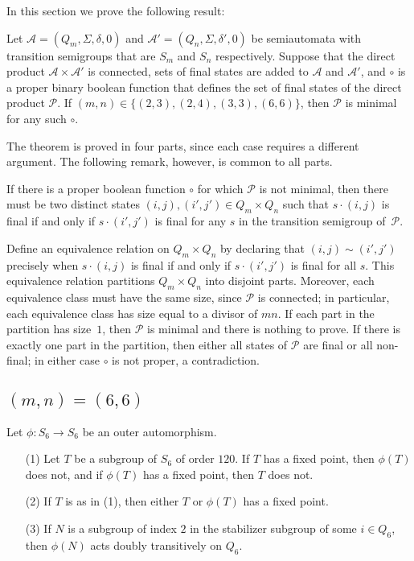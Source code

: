 \documentclass{llncs}
\newcommand{\Sig}{\Sigma}
\newcommand{\cA}{{\mathcal A}}
\newcommand{\cP}{{\mathcal P}}
\begin{document}
In this section we prove the following result:
\begin{theorem}
\label{thm: small}
Let $\cA=(Q_m,\Sig, \delta,0)$ and $\cA'=(Q_n,\Sig, \delta',0)$ be 
semiautomata with transition semigroups that are  $S_m$ and $S_n$ respectively. Suppose that the direct product $\cA\times \cA'$ is connected, sets of final states are added to $\cA$ and $\cA'$, and  $\circ$ is a proper binary boolean function that defines the set of final states of the direct product $\cP$. If $(m,n)\in \{(2,3),(2,4),(3,3),(6,6)\}$, then $\cP$ is minimal for any such $\circ$.
\end{theorem}
The theorem is proved in four parts, since each case requires  a different argument.
The following remark, however, is common to all parts.

\begin{remark}
\label{rem:equiv}
If  there is a proper boolean function $\circ$ for which $\cP$ is not minimal, then there must be two distinct states $(i,j), (i',j')\in Q_m\times Q_n$  such that $s\cdot (i,j)$ is final if and only if $s\cdot (i',j')$ is final for any $s$ in the transition semigroup of~$\cP$.  

Define an equivalence relation on $Q_m \times Q_n$ by declaring that $(i,j)\sim (i',j')$ precisely when  $s\cdot (i,j)$ is final if and only if $s\cdot (i',j')$ is final for all $s$.  
This equivalence relation partitions $Q_m\times Q_n$ into disjoint parts.  Moreover, each equivalence class must have the same size, since $\cP$ is connected; in particular, each equivalence class has size equal to a divisor of $mn$.  If each part in the partition has size~$1$, then $\cP$ is minimal and there is nothing to prove.   
If there is exactly one part in the partition, then either all states of $\cP$ are final or all non-final; in either case $\circ$ is not proper, a contradiction. 
\end{remark}
\subsection{$(m,n)=(6,6)$}

\begin{lemma}
Let $\phi:S_6\to S_6$ be an outer automorphism.  
\begin{enumerate}
\item[(1)] Let $T$ be a subgroup of $S_6$ of order $120$. 
If $T$ has a fixed point, then  $\phi(T)$ does not, and 
if $\phi(T)$ has a fixed point, then $T$ does not.
\item[(2)] 
If $T$ is as in (1), then either $T$ or $\phi(T)$ has a fixed point. 
\item[(3)]
If $N$ is a subgroup of index $2$ in the stabilizer subgroup of some $i\in Q_6$, then $\phi(N)$ acts doubly transitively on $Q_6$.
\end{enumerate}
\label{lem:s6}
\end{lemma}
\end{document}
